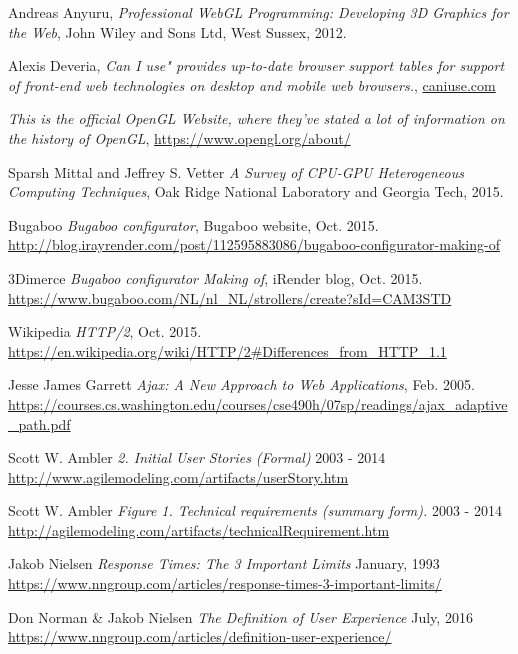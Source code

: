 
\begin{thebibliography}{9}

  Andreas Anyuru,
  \emph{Professional WebGL Programming: Developing 3D Graphics for the Web},
  John Wiley and Sons Ltd, West Sussex,
  2012.
  
  Alexis Deveria,
  \emph{Can I use" provides up-to-date browser support tables for support of front-end web technologies on desktop and mobile web browsers.},
  \url{caniuse.com}
  
	\emph{This is the official OpenGL Website, where they've stated a lot of information on the history of OpenGL},
	\url{https://www.opengl.org/about/}
	
	Sparsh Mittal and Jeffrey S. Vetter
	\emph{A Survey of CPU-GPU Heterogeneous Computing Techniques},
	Oak Ridge National Laboratory and Georgia Tech,
	2015.
	
	Bugaboo
	\emph{Bugaboo configurator},
	Bugaboo website,
	Oct. 2015.
	\url{http://blog.irayrender.com/post/112595883086/bugaboo-configurator-making-of}
	
	3Dimerce
	\emph{Bugaboo configurator Making of},
	iRender blog,
	Oct. 2015.
	\url{https://www.bugaboo.com/NL/nl_NL/strollers/create?sId=CAM3STD}
	
	Wikipedia
	\emph{HTTP/2},
	Oct. 2015.
	\url{https://en.wikipedia.org/wiki/HTTP/2#Differences_from_HTTP_1.1}
	
	Jesse James Garrett
	\emph{Ajax: A New Approach to Web Applications},
	Feb. 2005.
	\url{https://courses.cs.washington.edu/courses/cse490h/07sp/readings/ajax_adaptive_path.pdf}
	
	Scott W. Ambler
	\emph{2. Initial User Stories (Formal)}
	2003 - 2014
	\url{http://www.agilemodeling.com/artifacts/userStory.htm}
	
	Scott W. Ambler
	\emph{Figure 1. Technical requirements (summary form).}
	2003 - 2014
	\url{http://agilemodeling.com/artifacts/technicalRequirement.htm}
	
	Jakob Nielsen
	\emph{Response Times: The 3 Important Limits}
	January, 1993
	\url{https://www.nngroup.com/articles/response-times-3-important-limits/}
	
	Don Norman \& Jakob Nielsen
	\emph{The Definition of User Experience}
	July, 2016
	\url{https://www.nngroup.com/articles/definition-user-experience/}
	

\end{thebibliography}
